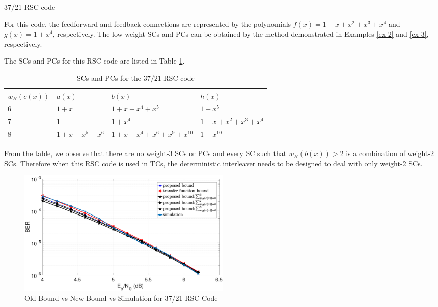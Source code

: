 \begin{example}{37/21 RSC code}

For this code, the feedforward and feedback connections are represented by the polynomials $f(x)=1+x+x^2+x^3+x^4$ and $g(x)=1+x^4$, respectively. The low-weight SCs and PCs can be obtained by the method demonstrated in Examples \ref{ex-2} and \ref{ex-3}, respectively. 

The  SCs and PCs for this RSC code are listed in Table \ref{novelTab14}.
\begin{table}[htbp]
	\caption{SCs and PCs for the $37/21$ RSC code}
	\centering
	\begin{tabularx}{0.75\textwidth}{Xlll} 
		\hline
		$w_H(c(x))$&$a(x)$ & $b(x)$ & $h(x)$ \\ [0.5ex] 
		\hline\hline
		6&$1+x$ & $1+x+x^{4}+x^5$ & $1+x^5$\\
		\hline\hline
		7&$1$ & $1+x^4$ & $1+x+x^2+x^3+x^4$\\
		\hline\hline
		8&$1+x+x^5+x^6$ & $1+x+x^4+x^6+x^9+x^{10}$ & $1+x^{10}$\\
		\hline
	\end{tabularx}
	
	\label{novelTab14}
\end{table}

From the table, we observe that there are no weight-3 SCs or PCs and every SC such that $w_H(b(x)) > 2$ is a combination of weight-2 SCs. Therefore when this RSC code is used in TCs, the deterministic interleaver needs to be designed to deal with only weight-2 SCs.
\begin{figure}[htbp]
	\centering
	\includegraphics[width=0.5\textwidth]{./Images/RSC_37_21_lower_weights2.eps}
	\caption{Old Bound vs New Bound vs Simulation for 37/21 RSC Code}
	\label{simFig2}
\end{figure}


\end{example}
